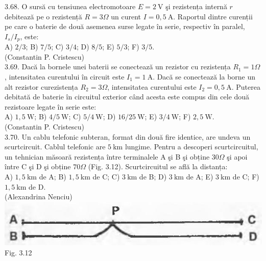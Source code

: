 3.68. O sursă cu tensiunea electromotoare $E=2 \mathrm{~V}$ şi rezistența internă $r$ debitează pe o rezistență $R=3 \Omega$ un curent $I=0,5 \mathrm{~A}$. Raportul dintre curenții pe care o baterie de două asemenea surse legate în serie, respectiv în paralel, $I_{s} / I_{p}$, este:\\ A) $2 / 3$; B) $7 / 5$; C) $3 / 4$; D) $8 / 5$; E) $5 / 3$; F) $3 / 5$.\\ (Constantin P. Cristescu)\\

3.69. Dacă la bornele unei baterii se conectează un rezistor cu rezistența $R_{1}=1 \Omega$, intensitatea curentului în circuit este $I_{1}=1 \mathrm{~A}$. Dacă se conectează la borne un alt rezistor curezistența $R_{2}=3 \Omega$, intensitatea curentului este $I_{2}=0,5 \mathrm{~A}$. Puterea debitată de baterie în circuitul exterior când acesta este compus din cele două rezistoare legate în serie este:\\ A) $1,5 \mathrm{~W}$; B) $4 / 5 \mathrm{~W}$; C) $5 / 4 \mathrm{~W}$; D) $16 / 25 \mathrm{~W}$; E) $3 / 4 \mathrm{~W}$; F) $2,5 \mathrm{~W}$.\\ (Constantin P. Cristescu)\\

3.70. Un cablu telefonic subteran, format din două fire identice, are undeva un scurtcircuit. Cablul telefonic are $5 \mathrm{~km}$ lungime. Pentru a descoperi scurtcircuitul, un tehnician măsoară rezistența între terminalele A şi B şi obține $30 \Omega$ şi apoi între C şi D şi obține $70 \Omega$ (Fig. 3.12). Scurtcircuitul se află la distanța:\\ A) $1,5 \mathrm{~km}$ de A; B) $1,5 \mathrm{~km}$ de C; C) $3 \mathrm{~km}$ de B; D) $3 \mathrm{~km}$ de A; E) $3 \mathrm{~km}$ de C; F) $1,5 \mathrm{~km}$ de D.\\ (Alexandrina Nenciu)\\ \includegraphics[width=0.4\linewidth]{images/2025_07_01_5b3ff9fa0d508c8e9f17g-159} Fig. 3.12\\

